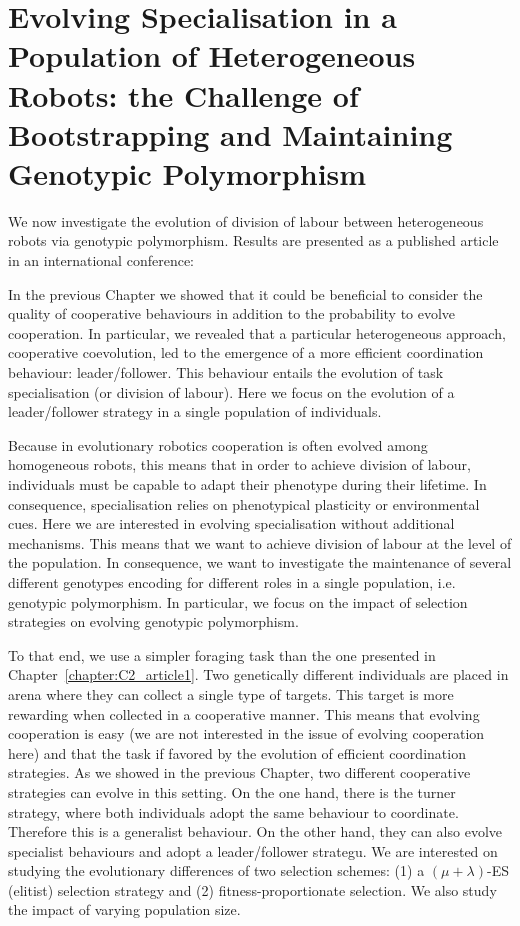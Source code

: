\chapter{Evolving Specialisation in a Population of Heterogeneous Robots: the Challenge of Bootstrapping and Maintaining Genotypic Polymorphism}
\label{chapter:C2_article2}

\setcounter{secnumdepth}{0}
\setcounter{minitocdepth}{1}
\minitoc[n] %

We now investigate the evolution of division of labour between heterogeneous robots via genotypic polymorphism. Results are presented as a published article in an international conference:

\begin{quote}
\end{quote}


In the previous Chapter we showed that it could be beneficial to consider the quality of cooperative behaviours in addition to the probability to evolve cooperation. In particular, we revealed that a particular heterogeneous approach, cooperative coevolution, led to the emergence of a more efficient coordination behaviour: leader/follower. This behaviour entails the evolution of task specialisation (or division of labour). Here we focus on the evolution of a leader/follower strategy in a single population of individuals. 

Because in evolutionary robotics cooperation is often evolved among homogeneous robots, this means that in order to achieve division of labour, individuals must be capable to adapt their phenotype during their lifetime. In consequence, specialisation relies on phenotypical plasticity or environmental cues. Here we are interested in evolving specialisation without additional mechanisms. This means that we want to achieve division of labour at the level of the population. In consequence, we want to investigate the maintenance of several different genotypes encoding for different roles in a single population, i.e. genotypic polymorphism. In particular, we focus on the impact of selection strategies on evolving genotypic polymorphism.

To that end, we use a simpler foraging task than the one presented in Chapter~\ref{chapter:C2_article1}. Two genetically different individuals are placed in arena where they can collect a single type of targets. This target is more rewarding when collected in a cooperative manner. This means that evolving cooperation is easy (we are not interested in the issue of evolving cooperation here) and that the task if favored by the evolution of efficient coordination strategies. As we showed in the previous Chapter, two different cooperative strategies can evolve in this setting. On the one hand, there is the turner strategy, where both individuals adopt the same behaviour to coordinate. Therefore this is a generalist behaviour. On the other hand, they can also evolve specialist behaviours and adopt a leader/follower strategu. We are interested on studying the evolutionary differences of two selection schemes: (1) a \((\mu + \lambda)\)-ES (elitist) selection strategy and (2) fitness-proportionate selection. We also study the impact of varying population size.

